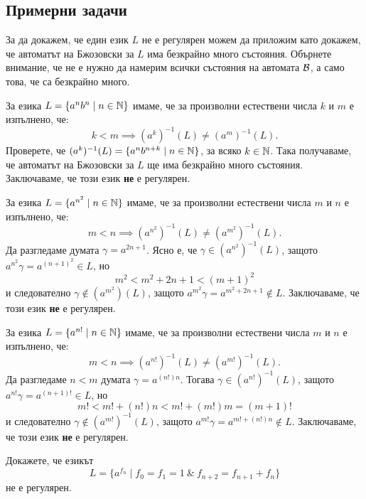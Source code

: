 \subsection{Примерни задачи}

За да докажем, че един език $L$ не е регулярен можем да приложим 
като докажем, че автоматът на Бжозовски за $L$ има безкрайно много състояния.
Обърнете внимание, че не е нужно да намерим всички състояния на автомата $\mathcal{B}$, а само това, че са безкрайно много.

\begin{example}
  За езика $L = \{a^nb^n\mid n \in \mathbb{N}\}$ имаме, че за произволни естествени числа $k$ и $m$ е изпълнено, че:
  \[k < m \implies (a^k)^{-1}(L) \neq (a^m)^{-1}(L).\]
  Проверете, че $(a^k)^{-1}(L) = \{a^{n}b^{n+k} \mid n\in\mathbb{N}\}$, за всяко $k \in \mathbb{N}$.
  Така получаваме, че автоматът на Бжозовски за $L$ ще има безкрайно много състояния.
  Заключаваме, че този език {\bf не} е регулярен.
\end{example}

\begin{example}
  За езика $L = \{a^{n^2} \mid n \in \mathbb{N}\}$ имаме, че за произволни естествени числа $m$ и $n$ е изпълнено, че:
  \[m < n \implies (a^{n^2})^{-1}(L) \neq (a^{m^2})^{-1}(L).\]
  Да разгледаме думата $\gamma = a^{2n+1}$. Ясно е, че $\gamma \in (a^{n^2})^{-1}(L)$, защото $a^{n^2}\gamma = a^{(n+1)^2} \in L$, но 
  \[m^2 < m^2 + 2n + 1 < (m+1)^2\]
  и следователно $\gamma \not\in (a^{m^2})(L)$, защото $a^{m^2}\gamma = a^{m^2+2n+1}\not\in L$.
  Заключаваме, че този език {\bf не} е регулярен.
\end{example}

\begin{example}
  За езика $L = \{a^{n!} \mid n \in \mathbb{N}\}$ имаме, че за произволни естествени числа $m$ и $n$ е изпълнено, че:
  \[m < n \implies (a^{n!})^{-1}(L) \neq (a^{m!})^{-1}(L).\]
  Да разгледаме $n < m$ думата $\gamma = a^{(n!)n}$.
  Тогава $\gamma \in (a^{n!})^{-1}(L)$, защото $a^{n!}\gamma = a^{(n+1)!} \in L$, но 
  \[m! < m! + (n!)n < m! + (m!)m = (m+1)!\]
  и следователно $\gamma \not\in (a^{m!})^{-1}(L)$,
  защото $a^{m!}\gamma = a^{m!+(n!)n}\not\in L$.
  Заключаваме, че този език {\bf не} е регулярен.
\end{example}

\begin{problem}
  Докажете, че езикът 
  \[L = \{a^{f_n} \mid f_0 = f_1 = 1\ \&\ f_{n+2} = f_{n+1} + f_{n}\}\]
  не е регулярен.
\end{problem}

